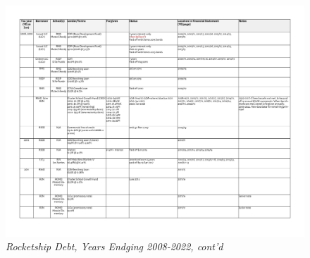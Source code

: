 \begin{figure}
  \caption*{\textit{Rocketship Debt, Years Endging 2008-2022, cont'd}}
  \includegraphics[page=5,width=\textheight]{Debt_2008-2022} %
\end{figure}


